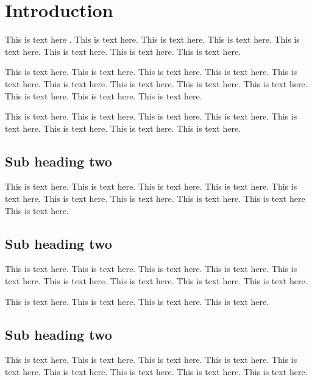\documentclass[a4paper,10pt]{edpsci} %
\begin{document}

\maketitle

\section{Introduction}

This is text here \cite{Ref1}. This is text here. This is text here. This is text here.
This is text here. This is text here. This is text here. This is text here.

This is text here. This is text here. This is text here. This is text here. This is text here. This is text here. This is text here. This is text here. This is text here. This is text here. This is text here. This is text here.

This is text here. This is text here. This is text here. This is text here. This is text here. This is text here. This is text here. This is text here.

\subsection{Sub heading two}

This is text here. This is text here. This is text here. This is text here. This is text here. This is text here.
This is text here. This is text here. This is text here \cite{Ref2} This is text here.

\subsection{Sub heading two}

This is text here. This is text here. This is text here. This is text here. This is text here. This is text here. This is text here. This is text here. This is text here. 

This is text here. This is text here. This is text here. This is text here.

\subsection{Sub heading two}

This is text here. This is text here. This is text here. This is text here. This is text here. This is text here. This is text here. This is text here. This is text here.
\end{document}
